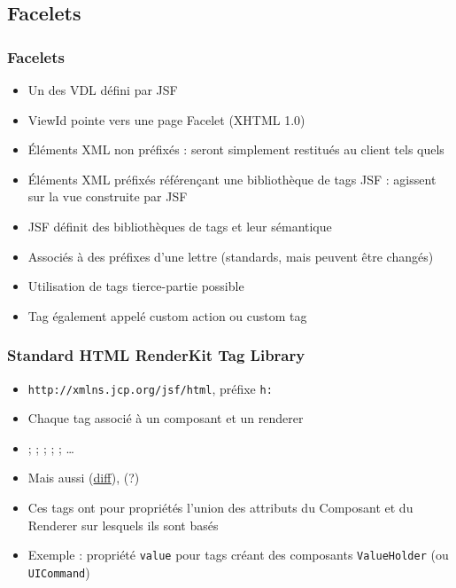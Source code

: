 \documentclass[english, french]{beamer}
\begin{document}
\subsection{Facelets}
\begin{frame}
	\frametitle{Facelets}
	\begin{itemize}
		\item Un des VDL défini par JSF
		\item ViewId pointe vers une page Facelet (XHTML 1.0)
		\item Éléments XML non préfixés : seront simplement restitués au client tels quels
		\item Éléments XML préfixés référençant une bibliothèque de tags JSF : agissent sur la vue construite par JSF
		\item JSF définit des bibliothèques de tags et leur sémantique
		\item Associés à des préfixes d’une lettre {\tiny (standards, mais peuvent être changés)}
		\item Utilisation de tags tierce-partie possible
		\item \tiny Tag également appelé custom action ou custom tag
	\end{itemize}
\end{frame}

\begin{frame}
	\frametitle{Standard HTML RenderKit Tag Library}
	\begin{itemize}
		\item \texttt{http://xmlns.jcp.org/jsf/html}, préfixe \texttt{h:}
		\item Chaque tag associé à un composant et un renderer  %
		\item {} ;  ;  ;  ;  ; …
		\item Mais aussi  (\href{http://stackoverflow.com/questions/6469298/difference-between-hlink-and-houtputlink}{diff}),  (?)
		\item Ces tags ont pour propriétés l’union des attributs du Composant et du Renderer sur lesquels ils sont basés
		\item Exemple : propriété \texttt{value} pour tags créant des composants \texttt{ValueHolder} (ou \texttt{UICommand})
	\end{itemize}
\end{frame}
\end{document}
